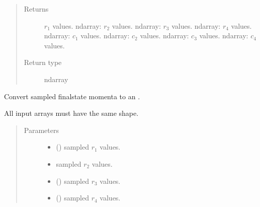 \documentclass[letterpaper,10pt,english]{sphinxmanual}
\begin{document}
\begin{fulllineitems}
\begin{fulllineitems}
\begin{quote}
\begin{description}
\item[{Returns}] \leavevmode
\(r_1\) values.
ndarray: \(r_2\) values.
ndarray: \(r_3\) values.
ndarray: \(r_4\) values.
ndarray: \(c_1\) values.
ndarray: \(c_2\) values.
ndarray: \(c_3\) values.
ndarray: \(c_4\) values.

\item[{Return type}] \leavevmode
ndarray

\end{description}\end{quote}

\end{fulllineitems}


\begin{fulllineitems}
\label{\detokenize{code_structure:scdc.initial.distribution.integral.InitialSampler.samples_to_ensemble}}
Convert sampled final\sphinxhyphen{}state momenta to an .

All input arrays must have the same shape.
\begin{quote}\begin{description}
\item[{Parameters}] \leavevmode\begin{itemize}
\item {} 
 () \textendash{} sampled \(r_1\) values.

\item {} 
 \textendash{} sampled \(r_2\) values.

\item {} 
 () \textendash{} sampled \(r_3\) values.

\item {} 
 () \textendash{} sampled \(r_4\) values.


\end{itemize}
\end{description}
\end{quote}
\end{fulllineitems}
\end{fulllineitems}
\end{document}
